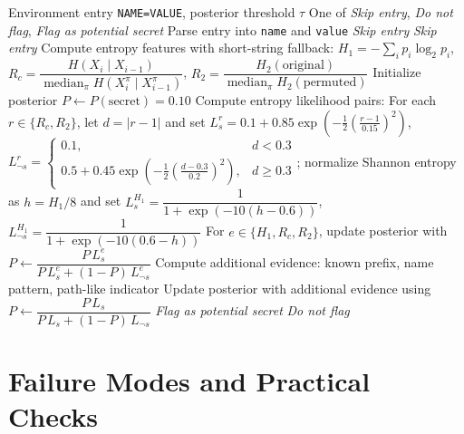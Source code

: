 \documentclass[10pt]{article}
\begin{document}
\begin{algorithm}[ht]
\caption{Operational screening pseudocode}
\label{alg:screening}
\begin{algorithmic}[1]
\Require Environment entry \texttt{NAME=VALUE}, posterior threshold $\tau$
\Ensure One of \emph{Skip entry}, \emph{Do not flag}, \emph{Flag as potential secret}
\State Parse entry into \texttt{name} and \texttt{value}
  \State \Return \emph{Skip entry}
\EndIf
{}
  \State \Return \emph{Skip entry}
\EndIf
\State Compute entropy features with short-string fallback:
\Statex \hspace{1.5em}$H_1 = -\sum_i p_i\log_2 p_i$, $R_c = \dfrac{H(X_i\mid X_{i-1})}{\operatorname{median}_{\pi} H(X_i^{\pi}\mid X_{i-1}^{\pi})}$, $R_2 = \dfrac{H_2(\text{original})}{\operatorname{median}_{\pi} H_2(\text{permuted})}$
\State Initialize posterior $P\gets P(\text{secret})=0.10$
\State Compute entropy likelihood pairs:
\Statex \hspace{1.5em}For each $r\in\{R_c,R_2\}$, let $d=|r-1|$ and set
\Statex \hspace{1.5em}$L_s^{r}=0.1+0.85\exp\!\left(-\tfrac12\left(\tfrac{r-1}{0.15}\right)^2\right)$,
\Statex \hspace{1.5em}$L_{\neg s}^{r}=\begin{cases}0.1,&d<0.3\\0.5+0.45\exp\!\left(-\tfrac12\left(\tfrac{d-0.3}{0.2}\right)^2\right),&d\ge 0.3\end{cases}$;
\Statex \hspace{1.5em}normalize Shannon entropy as $h=H_1/8$ and set
\Statex \hspace{1.5em}$L_s^{H_1}=\dfrac{1}{1+\exp(-10(h-0.6))}$, $L_{\neg s}^{H_1}=\dfrac{1}{1+\exp(-10(0.6-h))}$
\State For $e\in\{H_1,R_c,R_2\}$, update posterior with
\Statex \hspace{1.5em}$P \gets \dfrac{P\,L_s^{e}}{P\,L_s^{e} + (1-P)\,L_{\neg s}^{e}}$
\State Compute additional evidence: known prefix, name pattern, path-like indicator
\State Update posterior with additional evidence using
\Statex \hspace{1.5em}$P \gets \dfrac{P\,L_s}{P\,L_s + (1-P)\,L_{\neg s}}$
  \State \Return \emph{Flag as potential secret}
\Else
  \State \Return \emph{Do not flag}
\EndIf
\end{algorithmic}
\end{algorithm}

\section*{Failure Modes and Practical Checks}
\end{document}
